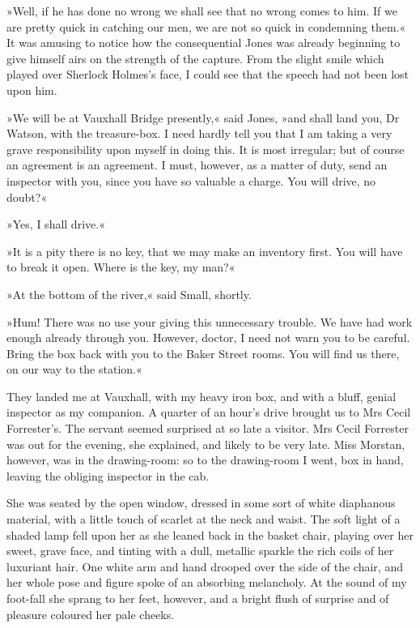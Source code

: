 »Well, if he has done no wrong we shall see that no wrong comes to him. If we are pretty quick in catching our men, we are not so quick in condemning them.« It was amusing to notice how the consequential Jones was already beginning to give himself airs on the strength of the capture. From the slight smile which played over Sherlock Holmes's face, I could see that the speech had not been lost upon him.

»We will be at Vauxhall Bridge presently,« said Jones, »and shall land you, Dr Watson, with the treasure-box. I need hardly tell you that I am taking a very grave responsibility upon myself in doing this. It is most irregular; but of course an agreement is an agreement. I must, however, as a matter of duty, send an inspector with you, since you have so valuable a charge. You will drive, no doubt?«

»Yes, I shall drive.«

»It is a pity there is no key, that we may make an inventory first. You will have to break it open. Where is the key, my man?«

»At the bottom of the river,« said Small, shortly.

»Hum! There was no use your giving this unnecessary trouble. We have had work enough already through you. However, doctor, I need not warn you to be careful. Bring the box back with you to the Baker Street rooms. You will find us there, on our way to the station.«

They landed me at Vauxhall, with my heavy iron box, and with a bluff, genial inspector as my companion. A quarter of an hour's drive brought us to Mrs Cecil Forrester's. The servant seemed surprised at so late a visitor. Mrs Cecil Forrester was out for the evening, she explained, and likely to be very late. Miss Morstan, however, was in the drawing-room: so to the drawing-room I went, box in hand, leaving the obliging inspector in the cab.

She was seated by the open window, dressed in some sort of white diaphanous material, with a little touch of scarlet at the neck and waist. The soft light of a shaded lamp fell upon her as she leaned back in the basket chair, playing over her sweet, grave face, and tinting with a dull, metallic sparkle the rich coils of her luxuriant hair. One white arm and hand drooped over the side of the chair, and her whole pose and figure spoke of an absorbing melancholy. At the sound of my foot-fall she sprang to her feet, however, and a bright flush of surprise and of pleasure coloured her pale cheeks.

